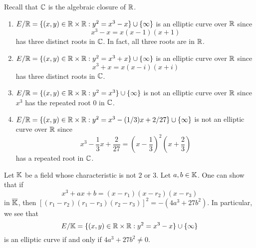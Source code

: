 \begin{exmp}
    Recall that $\mathbb{C}$ is the algebraic closure of $\mathbb{R}$. 
    \begin{enumerate}[(1)]
        \item $E/\mathbb{R} = \{(x, y) \in \mathbb{R} \times \mathbb{R} : y^2 = x^3 - x\} \cup \{\infty\}$
        is an elliptic curve over $\mathbb{R}$ since 
        \[ x^3 - x = x(x-1)(x+1) \] 
        has three distinct roots in $\mathbb{C}$. In fact, all three roots are in $\mathbb{R}$. 
        \item $E/\mathbb{R} = \{(x, y) \in \mathbb{R} \times \mathbb{R} : y^2 = x^3 + x\} \cup \{\infty\}$
        is an elliptic curve over $\mathbb{R}$ since
        \[ x^3 + x = x(x-i)(x+i) \] 
        has three distinct roots in $\mathbb{C}$. 
        \item $E/\mathbb{R} = \{(x, y) \in \mathbb{R} \times \mathbb{R} : y^2 = x^3\} \cup \{\infty\}$
        is not an elliptic curve over $\mathbb{R}$ since $x^3$ has the repeated root 
        $0$ in $\mathbb{C}$. 
        \item $E/\mathbb{R} = \{(x, y) \in \mathbb{R} \times \mathbb{R} : y^2 = x^3 - (1/3)x + 
        2/27\} \cup \{\infty\}$ is not an elliptic curve over $\mathbb{R}$ since 
        \[ x^3 - \frac13x + \frac{2}{27} = \left(x - \frac13\right)^{\!2}\left(x + \frac23\right) \] 
        has a repeated root in $\mathbb{C}$.
    \end{enumerate}
\end{exmp}

\begin{remark}
    Let $\mathbb{K}$ be a field whose characteristic is not $2$ or $3$. Let 
    $a, b \in \mathbb{K}$. One can show that if 
    \[ x^3 + ax + b = (x - r_1)(x - r_2)(x - r_3) \] 
    in $\overline{\mathbb{K}}$, then $[(r_1 - r_2)(r_1 - r_3)(r_2 - r_3)]^2 = -(4a^3 + 27b^2)$. 
    In particular, we see that 
    \[ E/\mathbb{K} = \{(x, y) \in \mathbb{R} \times \mathbb{R} : y^2 = x^3 - x\} \cup \{\infty\} \] 
    is an elliptic curve if and only if $4a^3 + 27b^2 \neq 0$. 
\end{remark}